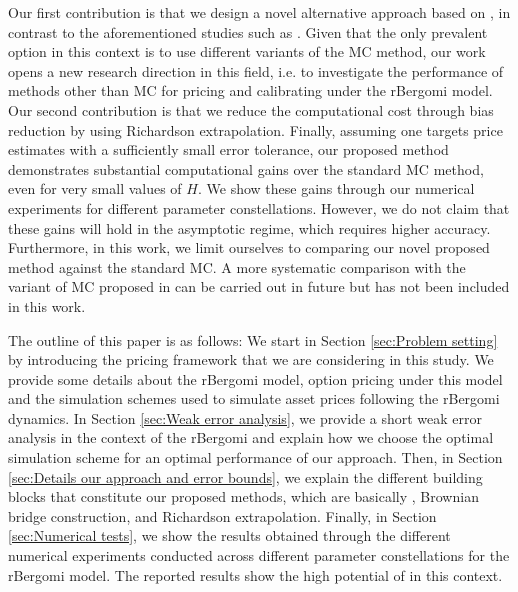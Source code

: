 Our first contribution is that we design a novel alternative approach based on , in contrast to the aforementioned studies such as \cite{mccrickerd2018turbocharging}. Given that the only prevalent option in this context is to use different variants of the MC method, our work opens a new  research direction in this field, i.e.  to investigate the performance of methods other than MC for pricing and calibrating under the rBergomi model. Our second contribution is that we reduce the computational cost  through bias reduction by using Richardson extrapolation. Finally, assuming one targets price estimates with a sufficiently small  error tolerance, our proposed method demonstrates substantial computational gains  over the standard MC method, even for very small values of  $H$. We show  these gains through our numerical experiments for  different parameter constellations. However, we do not claim that these gains will hold in the asymptotic regime, which requires higher accuracy. Furthermore,  in this work, we limit ourselves to comparing our novel proposed method against the standard MC. A more systematic comparison with the variant of MC proposed in \cite{mccrickerd2018turbocharging}  can be carried out in future but has not been included in this work. 

The outline of this paper is as follows: We start in Section \ref{sec:Problem setting} by  introducing  the pricing framework that we are considering in this study. We provide some details about the rBergomi model, option pricing under this model and the simulation schemes used to simulate asset prices following the rBergomi dynamics. In Section \ref{sec:Weak error analysis}, we provide a short weak error analysis in the context of the rBergomi  and explain how we choose the optimal simulation scheme for an optimal performance of our approach. Then, in Section \ref{sec:Details our approach and error bounds}, we explain the different building blocks that constitute our proposed methods, which are basically , Brownian bridge construction, and Richardson extrapolation. Finally, in Section \ref{sec:Numerical tests}, we show the results obtained through the different numerical experiments conducted across different parameter constellations for the rBergomi model. The reported results show the high potential of  in this context.

